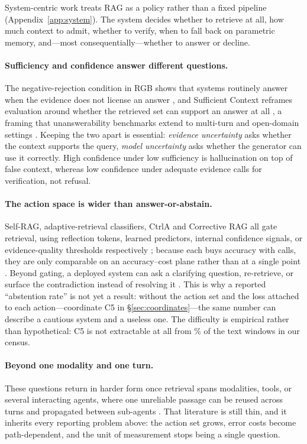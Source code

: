 System-centric work treats RAG as a policy rather than a fixed pipeline
(Appendix~\ref{app:system}). The system decides whether to retrieve at all, how much context
to admit, whether to verify, when to fall back on parametric memory, and---most consequentially---whether
to answer or decline.

\paragraph{Sufficiency and confidence answer different questions.}
The negative-rejection condition in RGB shows that systems routinely answer when the evidence
does not license an answer \citep{rgb2023}, and Sufficient Context reframes evaluation around
whether the retrieved set can support an answer at all \citep{sufficientContext2024}, a framing
that unanswerability benchmarks extend to multi-turn and open-domain settings
\citep{rrag111,rrag141}. Keeping the two apart is essential: \emph{evidence uncertainty} asks
whether the context supports the query, \emph{model uncertainty} asks whether the generator can
use it correctly. High confidence under low sufficiency is hallucination on top of false
context, whereas low confidence under adequate evidence calls for verification, not refusal.

\paragraph{The action space is wider than answer-or-abstain.}
Self-RAG, adaptive-retrieval classifiers, CtrlA and Corrective RAG all gate retrieval, using
reflection tokens, learned predictors, internal confidence signals, or evidence-quality
thresholds respectively \citep{selfRAG2023,whenToRetrieve2024,ctrla2025,crag2024}; because each
buys accuracy with calls, they are only comparable on an accuracy--cost plane rather than at a
single point \citep{rrag006}. Beyond gating, a deployed system can ask a clarifying question,
re-retrieve, or surface the contradiction instead of resolving it \citep{rrag141}. This is why
a reported ``abstention rate'' is not yet a result: without the action set and the loss attached
to each action---coordinate C5 in \S\ref{sec:coordinates}---the same number can describe a
cautious system and a useless one. The difficulty is empirical rather than hypothetical: C5 is
not extractable at all from \SilentPct{}\% of the text windows in our census.

\paragraph{Beyond one modality and one turn.}
These questions return in harder form once retrieval spans modalities, tools, or several
interacting agents, where one unreliable passage can be reused across turns and propagated
between sub-agents \citep{rrag229,rrag219,rrag051}. That literature is still thin, and it
inherits every reporting problem above: the action set grows, error costs become
path-dependent, and the unit of measurement stops being a single question.
